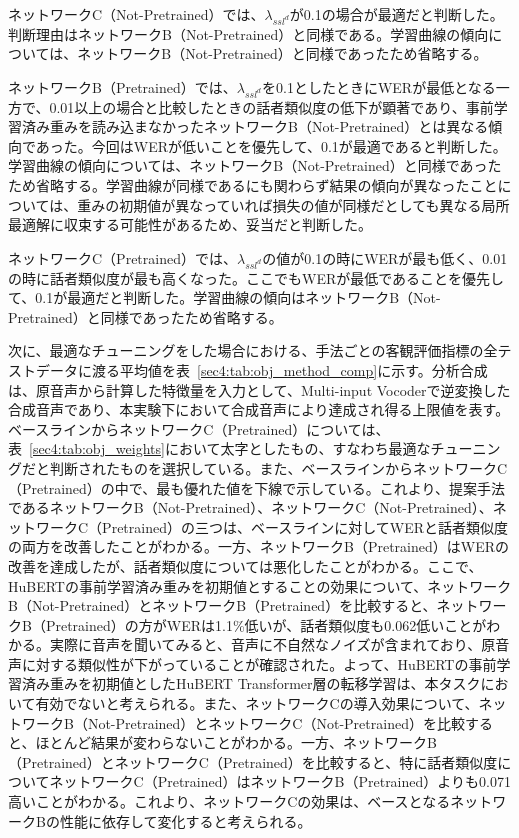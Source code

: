 \documentclass[12pt]{jarticle}
\numberwithin{equation}{section}    %
\numberwithin{figure}{section}      %
\numberwithin{table}{section}      %
\begin{document}
ネットワークC（Not-Pretrained）では、$\lambda_{ssl^{d}}$が0.1の場合が最適だと判断した。判断理由はネットワークB（Not-Pretrained）と同様である。学習曲線の傾向については、ネットワークB（Not-Pretrained）と同様であったため省略する。

ネットワークB（Pretrained）では、$\lambda_{ssl^{d}}$を0.1としたときにWERが最低となる一方で、0.01以上の場合と比較したときの話者類似度の低下が顕著であり、事前学習済み重みを読み込まなかったネットワークB（Not-Pretrained）とは異なる傾向であった。今回はWERが低いことを優先して、0.1が最適であると判断した。学習曲線の傾向については、ネットワークB（Not-Pretrained）と同様であったため省略する。学習曲線が同様であるにも関わらず結果の傾向が異なったことについては、重みの初期値が異なっていれば損失の値が同様だとしても異なる局所最適解に収束する可能性があるため、妥当だと判断した。

ネットワークC（Pretrained）では、$\lambda_{ssl^{d}}$の値が0.1の時にWERが最も低く、0.01の時に話者類似度が最も高くなった。ここでもWERが最低であることを優先して、0.1が最適だと判断した。学習曲線の傾向はネットワークB（Not-Pretrained）と同様であったため省略する。

次に、最適なチューニングをした場合における、手法ごとの客観評価指標の全テストデータに渡る平均値を表~\ref{sec4:tab:obj_method_comp}に示す。分析合成は、原音声から計算した特徴量を入力として、Multi-input Vocoderで逆変換した合成音声であり、本実験下において合成音声により達成され得る上限値を表す。ベースラインからネットワークC（Pretrained）については、表~\ref{sec4:tab:obj_weights}において太字としたもの、すなわち最適なチューニングだと判断されたものを選択している。また、ベースラインからネットワークC（Pretrained）の中で、最も優れた値を下線で示している。これより、提案手法であるネットワークB（Not-Pretrained）、ネットワークC（Not-Pretrained）、ネットワークC（Pretrained）の三つは、ベースラインに対してWERと話者類似度の両方を改善したことがわかる。一方、ネットワークB（Pretrained）はWERの改善を達成したが、話者類似度については悪化したことがわかる。ここで、HuBERTの事前学習済み重みを初期値とすることの効果について、ネットワークB（Not-Pretrained）とネットワークB（Pretrained）を比較すると、ネットワークB（Pretrained）の方がWERは1.1\%低いが、話者類似度も0.062低いことがわかる。実際に音声を聞いてみると、音声に不自然なノイズが含まれており、原音声に対する類似性が下がっていることが確認された。よって、HuBERTの事前学習済み重みを初期値としたHuBERT Transformer層の転移学習は、本タスクにおいて有効でないと考えられる。また、ネットワークCの導入効果について、ネットワークB（Not-Pretrained）とネットワークC（Not-Pretrained）を比較すると、ほとんど結果が変わらないことがわかる。一方、ネットワークB（Pretrained）とネットワークC（Pretrained）を比較すると、特に話者類似度についてネットワークC（Pretrained）はネットワークB（Pretrained）よりも0.071高いことがわかる。これより、ネットワークCの効果は、ベースとなるネットワークBの性能に依存して変化すると考えられる。
\end{document}
